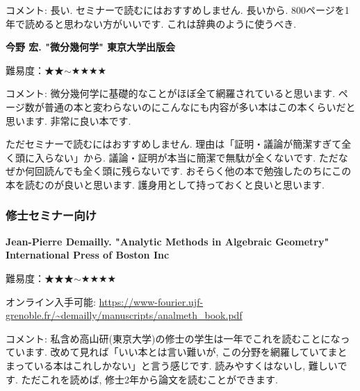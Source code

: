 コメント: 長い. セミナーで読むにはおすすめしません. 長いから. 800ページを1年で読めると思わない方がいいです. これは辞典のように使うべき. 
\vspace{8pt}

\textbf{今野 宏. "微分幾何学" 東京大学出版会}  \vspace{-6pt}

難易度：★★$\sim$★★★★ \vspace{-6pt} 

コメント: 微分幾何学に基礎的なことがほぼ全て網羅されていると思います. ページ数が普通の本と変わらないのにこんなにも内容が多い本はこの本くらいだと思います. 非常に良い本です. 

ただセミナーで読むにはおすすめしません. 理由は「証明・議論が簡潔すぎて全く頭に入らない」から.  議論・証明が本当に簡潔で無駄が全くないです. ただなぜか何回読んでも全く頭に残らないです. おそらく他の本で勉強したのちにこの本を読むのが良いと思います. 護身用として持っておくと良いと思います. 

\subsubsection{修士セミナー向け}

\textbf{Jean-Pierre Demailly. "Analytic Methods in Algebraic Geometry"  International Press of Boston Inc} \vspace{-6pt}

難易度：★★★$\sim$★★★★ \vspace{-6pt} 

オンライン入手可能: \url{https://www-fourier.ujf-grenoble.fr/~demailly/manuscripts/analmeth_book.pdf}\vspace{-6pt}

コメント: 私含め高山研(東京大学)の修士の学生は一年でこれを読むことになっています. 改めて見れば「いい本とは言い難いが, この分野を網羅していてまとまっている本はこれしかない」と言う感じです. 読みやすくはないし, 難しいです. ただこれを読めば, 修士2年から論文を読むことができます. 

